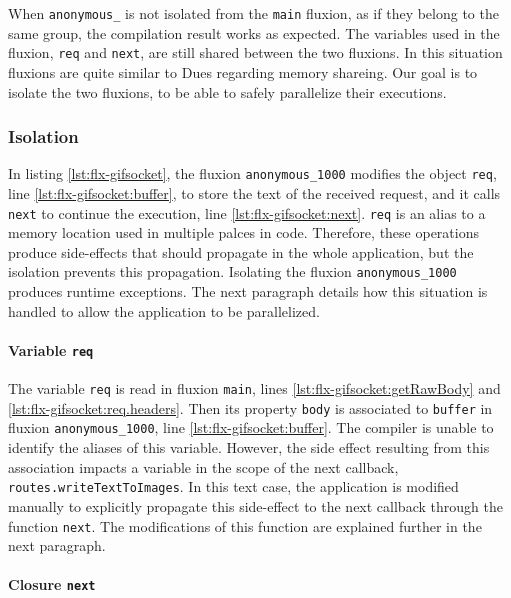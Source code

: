 When \texttt{anonymous\_} is not isolated from the \texttt{main} fluxion, as if they belong to the same group, the compilation result works as expected.
The variables used in the fluxion, \texttt{req} and \texttt{next}, are still shared between the two fluxions.
In this situation fluxions are quite similar to Dues regarding memory shareing.
Our goal is to isolate the two fluxions, to be able to safely parallelize their executions.

\subsubsection{Isolation} \label{chapter5:flx:evaluation:isolation}

In listing \ref{lst:flx-gifsocket}, the fluxion \texttt{anonymous\_1000} modifies the object \texttt{req}, line \ref{lst:flx-gifsocket:buffer}, to store the text of the received request, and it calls \texttt{next} to continue the execution, line \ref{lst:flx-gifsocket:next}.
\texttt{req} is an alias to a memory location used in multiple palces in code.
Therefore, these operations produce side-effects that should propagate in the whole application, but the isolation prevents this propagation.
Isolating the fluxion \texttt{anonymous\_1000} produces runtime exceptions.
The next paragraph details how this situation is handled to allow the application to be parallelized.

\paragraph{Variable \texttt{req}}

The variable \texttt{req} is read in fluxion \texttt{main}, lines \ref{lst:flx-gifsocket:getRawBody} and \ref{lst:flx-gifsocket:req.headers}.
Then its property \texttt{body} is associated to \texttt{buffer} in fluxion \texttt{anonymous\_1000}, line \ref{lst:flx-gifsocket:buffer}.
The compiler is unable to identify the aliases of this variable. %
However, the side effect resulting from this association impacts a variable in the scope of the next callback, \texttt{routes.writeTextToImages}.
In this text case, the application is modified manually to explicitly propagate this side-effect to the next callback through the function \texttt{next}.
The modifications of this function are explained further in the next paragraph.

\paragraph{Closure \texttt{next}}

